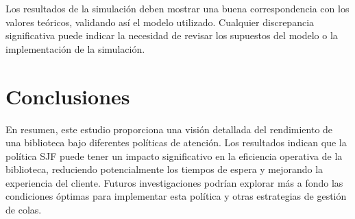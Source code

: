 \documentclass[10pt,twocolumn]{article}
\begin{document}
Los resultados de la simulación deben mostrar una buena correspondencia con los valores teóricos, validando así el modelo utilizado. Cualquier discrepancia significativa puede indicar la necesidad de revisar los supuestos del modelo o la implementación de la simulación.

\color{gray}
\section{Conclusiones}
En resumen, este estudio proporciona una visión detallada del rendimiento de una biblioteca bajo diferentes políticas de atención. Los resultados indican que la política SJF puede tener un impacto significativo en la eficiencia operativa de la biblioteca, reduciendo potencialmente los tiempos de espera y mejorando la experiencia del cliente. Futuros investigaciones podrían explorar más a fondo las condiciones óptimas para implementar esta política y otras estrategias de gestión de colas.
\end{document}

